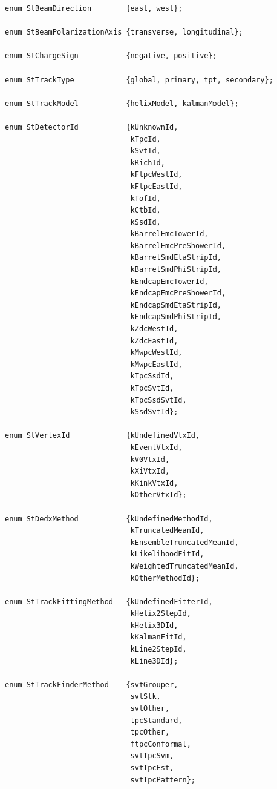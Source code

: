 \documentclass[twoside]{article}
\begin{document}
\begin{verbatim}
enum StBeamDirection        {east, west};

enum StBeamPolarizationAxis {transverse, longitudinal};

enum StChargeSign           {negative, positive};

enum StTrackType            {global, primary, tpt, secondary};

enum StTrackModel           {helixModel, kalmanModel};

enum StDetectorId           {kUnknownId,
                             kTpcId,
                             kSvtId,
                             kRichId,
                             kFtpcWestId,
                             kFtpcEastId,
                             kTofId,
                             kCtbId,
                             kSsdId,
                             kBarrelEmcTowerId,
                             kBarrelEmcPreShowerId,
                             kBarrelSmdEtaStripId,
                             kBarrelSmdPhiStripId,
                             kEndcapEmcTowerId,
                             kEndcapEmcPreShowerId,
                             kEndcapSmdEtaStripId,
                             kEndcapSmdPhiStripId,
                             kZdcWestId,
                             kZdcEastId,
                             kMwpcWestId,
                             kMwpcEastId,
                             kTpcSsdId,
                             kTpcSvtId,
                             kTpcSsdSvtId,
                             kSsdSvtId};

enum StVertexId             {kUndefinedVtxId,
                             kEventVtxId,
                             kV0VtxId,
                             kXiVtxId,
                             kKinkVtxId,
                             kOtherVtxId};

enum StDedxMethod           {kUndefinedMethodId,
                             kTruncatedMeanId,
                             kEnsembleTruncatedMeanId,
                             kLikelihoodFitId,
                             kWeightedTruncatedMeanId,
                             kOtherMethodId};
           
enum StTrackFittingMethod   {kUndefinedFitterId,
                             kHelix2StepId,
                             kHelix3DId,
                             kKalmanFitId,
                             kLine2StepId,
                             kLine3DId};

enum StTrackFinderMethod    {svtGrouper,
                             svtStk,
                             svtOther,
                             tpcStandard,
                             tpcOther,
                             ftpcConformal,
                             svtTpcSvm,
                             svtTpcEst,
                             svtTpcPattern};


\end{verbatim}
\end{document}
